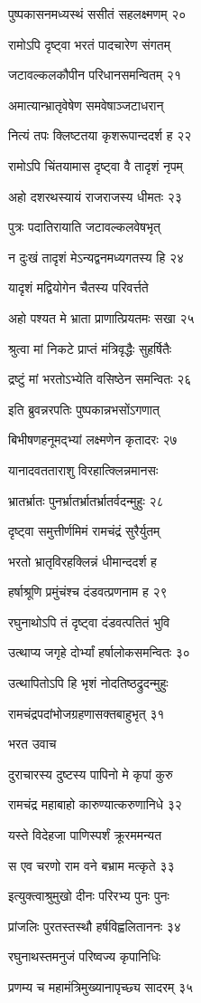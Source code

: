 पुष्पकासनमध्यस्थं ससीतं सहलक्ष्मणम् २०

रामोऽपि दृष्ट्वा भरतं पादचारेण संगतम्

जटावल्कलकौपीन परिधानसमन्वितम् २१

अमात्यान्भ्रातृवेषेण समवेषाञ्जटाधरान्

नित्यं तपः क्लिष्टतया कृशरूपान्ददर्श ह २२

रामोऽपि चिंतयामास दृष्ट्वा वै तादृशं नृपम्

अहो दशरथस्यायं राजराजस्य धीमतः २३

पुत्रः पदातिरायाति जटावल्कलवेषभृत्

न दुःखं तादृशं मेऽन्यद्वनमध्यगतस्य हि २४

यादृशं मद्वियोगेन चैतस्य परिवर्त्तते

अहो पश्यत मे भ्राता प्राणात्प्रियतमः सखा २५

श्रुत्वा मां निकटे प्राप्तं मंत्रिवृद्धैः सुहर्षितैः

द्रष्टुं मां भरतोऽभ्येति वसिष्ठेन समन्वितः २६

इति ब्रुवन्नरपतिः पुष्पकान्नभसोंऽगणात्

बिभीषणहनूमद्भ्यां लक्ष्मणेन कृतादरः २७

यानादवतताराशु विरहात्क्लिन्नमानसः

भ्रातर्भ्रातः पुनर्भ्रातर्भ्रातर्भ्रातर्वदन्मुहुः २८

दृष्ट्वा समुत्तीर्णमिमं रामचंद्रं सुरैर्युतम्

भरतो भ्रातृविरहक्लिन्नं धीमान्ददर्श ह

हर्षाश्रूणि प्रमुंचंश्च दंडवत्प्रणनाम ह २९

रघुनाथोऽपि तं दृष्ट्वा दंडवत्पतितं भुवि

उत्थाप्य जगृहे दोर्भ्यां हर्षालोकसमन्वितः ३०

उत्थापितोऽपि हि भृशं नोदतिष्ठद्रुदन्मुहुः

रामचंद्रपदांभोजग्रहणासक्तबाहुभृत् ३१

भरत उवाच

दुराचारस्य दुष्टस्य पापिनो मे कृपां कुरु

रामचंद्र महाबाहो कारुण्यात्करुणानिधे ३२

यस्ते विदेहजा पाणिस्पर्शं क्रूरममन्यत

स एव चरणो राम वने बभ्राम मत्कृते ३३

इत्युक्त्वाश्रुमुखो दीनः परिरभ्य पुनः पुनः

प्रांजलिः पुरतस्तस्थौ हर्षविह्वलिताननः ३४

रघुनाथस्तमनुजं परिष्वज्य कृपानिधिः

प्रणम्य च महामंत्रिमुख्यानापृच्छ्य सादरम् ३५

